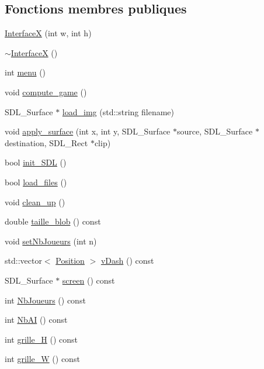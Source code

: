 \subsection*{Fonctions membres publiques}
\begin{DoxyCompactItemize}
\item 
\hyperlink{a00011_a4d0dc701199325adc921f65499354f3a}{InterfaceX} (int w, int h)
\item 
\hyperlink{a00011_a06d4159e8a0fe9591ebebfd20f79a055}{$\sim$InterfaceX} ()
\item 
int \hyperlink{a00011_a04f6a2f38eacdf947037eaf45092c33a}{menu} ()
\item 
void \hyperlink{a00011_a0e50405d74683c38fc1f0e3f71cf4c3d}{compute\_\-game} ()
\item 
SDL\_\-Surface $\ast$ \hyperlink{a00011_adb0d55fe794496b8588456dcf272ee4d}{load\_\-img} (std::string filename)
\item 
void \hyperlink{a00011_a7b7e5b7ff85bbcaf82c5bc75d481118d}{apply\_\-surface} (int x, int y, SDL\_\-Surface $\ast$source, SDL\_\-Surface $\ast$destination, SDL\_\-Rect $\ast$clip)
\item 
bool \hyperlink{a00011_a672b691c82429b955e09e352ab254319}{init\_\-SDL} ()
\item 
bool \hyperlink{a00011_a850000d49338e9ac40f28f625241ecf8}{load\_\-files} ()
\item 
void \hyperlink{a00011_aa26c292a0d00f6bdb48c611fc46e0a06}{clean\_\-up} ()
\item 
double \hyperlink{a00011_afb2d1a8f5360c53374ea396f366cccf0}{taille\_\-blob} () const 
\item 
void \hyperlink{a00011_addc58fa271a81d66c482aa8ac0e178af}{setNbJoueurs} (int n)
\item 
std::vector$<$ \hyperlink{a00014}{Position} $>$ \hyperlink{a00011_aa710ff2b044214ea1e47af43ee1ee231}{vDash} () const 
\item 
SDL\_\-Surface $\ast$ \hyperlink{a00011_ada4011aa7937ea45af992c4cad392238}{screen} () const 
\item 
int \hyperlink{a00011_aa202bf95ccd9db4a78a5eed055c56c22}{NbJoueurs} () const 
\item 
int \hyperlink{a00011_a9d87b046afcb1badd511cd1ee97ef062}{NbAI} () const 
\item 
int \hyperlink{a00011_a8883fd408fb230f1fc99a64dcb1cf1f8}{grille\_\-H} () const 
\item 
int \hyperlink{a00011_a893c8145402363b79888ef736a06c093}{grille\_\-W} () const 
\item 

\end{DoxyCompactItemize}
